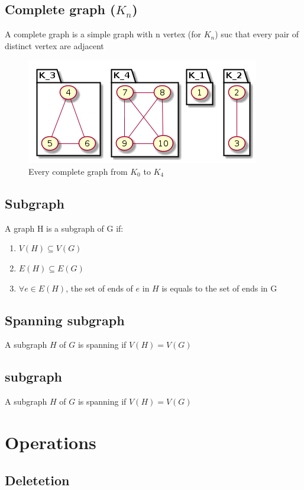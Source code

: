     \subsection{Complete graph ($K_n$)}
        A complete graph is a simple graph with n vertex (for $K_n$) suc that every pair of distinct vertex are adjacent\\
        \begin{figure}[h]
            \centering
            \includegraphics[scale=0.5]{ressources/images/CompleteGraphs.png}
            \caption{Every complete graph from $K_0$ to $K_4$}
            \label{Complete graph}
        \end{figure}
    \subsection{Subgraph}
        A graph H is a subgraph of G if:
        \begin{enumerate}
            \item $V(H)\subseteq V(G)$
            \item $E(H)\subseteq E(G)$
            \item  $\forall e \in E(H)$, the set of ends of $e$ in $H$ is equals to the set of ends in G
        \end{enumerate}
    \subsection{Spanning subgraph}
        A subgraph $H$ of $G$ is spanning if $V(H)=V(G)$
    \subsection{subgraph}
        A subgraph $H$ of $G$ is spanning if $V(H)=V(G)$

\section{Operations}
    \subsection{Deletetion}%
